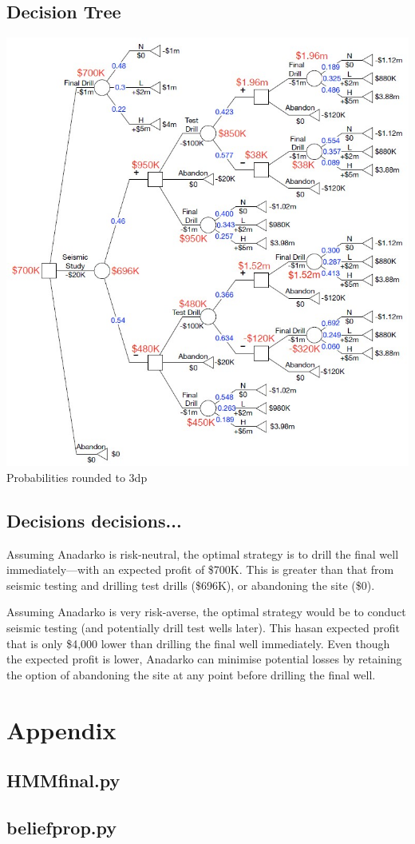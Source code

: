 \documentclass[12pt]{article}
\begin{document}
\subsection{Decision Tree}
\includegraphics[scale=0.8]{Decision-tree.jpg}
Probabilities rounded to 3dp
% 
\subsection{Decisions decisions...}
Assuming Anadarko is risk-neutral, the optimal strategy is to drill the final well immediately---with an expected profit of \$700K. This is greater than that from seismic testing and drilling test drills (\$696K), or abandoning the site (\$0).

Assuming Anadarko is very risk-averse, the optimal strategy would be to conduct seismic testing (and potentially drill test wells later). This hasan expected profit that is only \$4,000 lower than drilling the final well immediately. Even though the expected profit is lower, Anadarko can minimise potential losses by retaining the option of abandoning the site at any point before drilling the final well.

\newpage

\section{Appendix}
\subsection{HMMfinal.py}

\newpage
\subsection{beliefprop.py}

\end{document}

